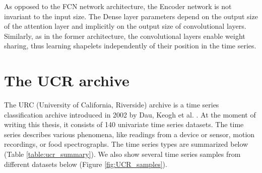 \documentclass[a4paper,11pt,twoside]{report}
\theoremstyle{definition}
\begin{document}
As opposed to the FCN network architecture, the Encoder network is not invariant to the input size. The Dense layer parameters depend on the output size of the attention layer and implicitly on the output size of convolutional layers.  Similarly, as in the former architecture, the convolutional layers enable weight sharing, thus learning shapelets independently of their position in the time series.


\section{The UCR archive}
The URC (University of California, Riverside) archive is a time series classification archive introduced in 2002 by Dau, Keogh et al. \cite{UCR_archive}. At the moment of writing this thesis, it consists of 140 univariate time series datasets. The time series describes various phenomena, like readings from a device or sensor, motion recordings, or food spectrographs. The time series types are summarized below (Table \ref{table:ucr_summary}). We also show several time series samples from different datasets below (Figure \ref{fig:UCR_samples}).
\begin{table}[!h]
\centering
\tabcolsep=0.11cm
\caption{Summary of types of datasets in the UCR archive.}
\label{table:ucr_summary}
\end{table}
\FloatBarrier
\end{document}
